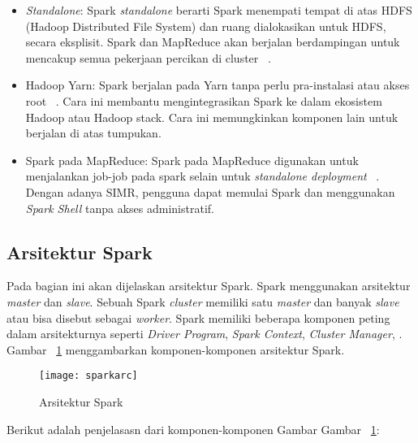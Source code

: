 \begin{itemize}

\item \textit{Standalone}: Spark \textit{standalone} berarti Spark menempati tempat di atas HDFS (Hadoop Distributed File System) dan ruang dialokasikan untuk HDFS, secara eksplisit. Spark dan MapReduce akan berjalan berdampingan untuk mencakup semua pekerjaan percikan di cluster ~\cite{holdenkarau:07:ls}.

\item Hadoop Yarn: Spark berjalan pada Yarn tanpa perlu pra-instalasi atau akses root ~\cite{holdenkarau:07:ls}. Cara ini membantu mengintegrasikan Spark ke dalam ekosistem Hadoop atau Hadoop stack. Cara ini memungkinkan komponen lain untuk berjalan di atas tumpukan.

\item Spark pada MapReduce: Spark pada MapReduce digunakan untuk menjalankan job-job pada spark selain untuk \textit{standalone deployment} ~\cite{holdenkarau:07:ls}. Dengan adanya SIMR, pengguna dapat memulai Spark dan menggunakan \textit{Spark Shell} tanpa akses administratif.\\

\end{itemize}









\subsection{Arsitektur Spark}

Pada bagian ini akan dijelaskan arsitektur Spark. Spark menggunakan arsitektur \textit{master} dan \textit{slave}. Sebuah Spark \textit{cluster} memiliki satu \textit{master} dan banyak \textit{slave} atau bisa disebut sebagai \textit{worker}. Spark memiliki beberapa komponen peting dalam arsitekturnya seperti \textit{Driver Program}, \textit{Spark Context}, \textit{Cluster Manager},  . Gambar ~\ref{fig:sparkarc} menggambarkan komponen-komponen arsitektur Spark.


\begin{figure}[H]
    \centering  
    \texttt{[image: sparkarc]}  
    \caption[Arsitektur Spark]{Arsitektur Spark} 
    \label{fig:sparkarc} 
\end{figure}

Berikut adalah penjelasasn dari komponen-komponen Gambar Gambar ~\ref{fig:sparkarc}:

